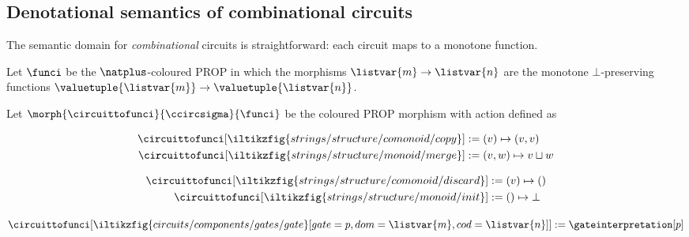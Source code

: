 \subsection{Denotational semantics of combinational circuits}

The semantic domain for \emph{combinational} circuits is straightforward: each
circuit maps to a monotone function.

\begin{definition}
    Let \(\funci\) be the \(\natplus\)-coloured PROP in which the morphisms
    \(\listvar{m} \to \listvar{n}\) are the monotone \(\bot\)-preserving
    functions \(\valuetuple{\listvar{m}} \to \valuetuple{\listvar{n}}\).
\end{definition}

\begin{definition}
    Let \(\morph{\circuittofunci}{\ccircsigma}{\funci}\) be the coloured PROP
    morphism with action defined as%
    \vspace{-\abovedisplayskip}
    \begin{center}
        \begin{minipage}{0.32\textwidth}
            \centering
            \begin{align*}
                \circuittofunci[
                    \iltikzfig{strings/structure/comonoid/copy}
                ]
                &:=
                (v) \mapsto (v, v)
                \\
                \circuittofunci[
                    \iltikzfig{strings/structure/monoid/merge}
                ]
                &:=
                (v, w) \mapsto v \sqcup w
            \end{align*}
        \end{minipage}
        \quad
        \begin{minipage}{0.25\textwidth}
            \centering
            \begin{align*}
                \circuittofunci[
                    \iltikzfig{strings/structure/comonoid/discard}
                ]
                &:=
                (v) \mapsto ()
                \\
                \circuittofunci[
                    \iltikzfig{strings/structure/monoid/init}
                ]
                &:=
                () \mapsto \bot
            \end{align*}
        \end{minipage}
        \quad
        \begin{minipage}{0.25\textwidth}
            \centering
            \vspace{1.5em}
            \(\circuittofunci[
                \iltikzfig{circuits/components/gates/gate}[gate=p,dom=\listvar{m},cod=\listvar{n}]
            ]
            :=
            \gateinterpretation[p]
            \)
        \end{minipage}
    \end{center}
\end{definition}


